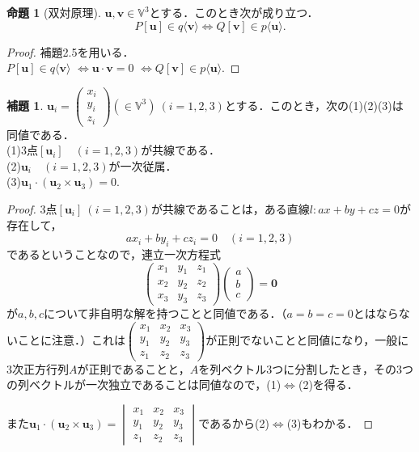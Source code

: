 \documentclass{jsarticle}
\theoremstyle{definition}
\newtheorem{prop}[theorem]{命題}
\newtheorem{lemma}[theorem]{補題}
\numberwithin{theorem}{section}
\numberwithin{equation}{section}
\begin{document}
\begin{prop}[双対原理]
$\bm{u},\bm{v}\in \mathbb{V}^3$とする．このとき次が成り立つ．
$$ P[\bm{u}]\in q\langle \bm{v}\rangle \Leftrightarrow Q[\bm{v}]\in p\langle \bm{u}\rangle .$$
\end{prop}
\begin{proof}補題2.5を用いる．
\\$P[\bm{u}]\in q\langle \bm{v}\rangle $
$\Leftrightarrow \bm{u}\cdot \bm{v}=0$
$\Leftrightarrow Q[\bm{v}]\in p\langle \bm{u}\rangle .$
\end{proof}
\begin{lemma}
$\bm{u}_i =\begin{pmatrix} x_i \\ y_i \\ z_i \end{pmatrix}(\in \mathbb{V}^3)\ (i=1,2,3)$とする．このとき，次の(1)(2)(3)は同値である．
\\(1)3点$[\bm{u}_i]\quad (i=1,2,3)$が共線である．
\\(2)$\bm{u}_i\quad (i=1,2,3)$が一次従属．
\\(3)$\bm{u}_1\cdot(\bm{u}_2\times\bm{u}_3)=0$.
\end{lemma}
\begin{proof}
3点$[\bm{u}_i]\ (i=1,2,3)$が共線であることは，ある直線$l:ax+by+cz=0$が存在して，
$$ax_i +by_i +cz_i =0 \quad (i=1,2,3)$$であるということなので，連立一次方程式
$$\begin{pmatrix}
    x_1 & y_1 & z_1 \\ x_2 & y_2 & z_2 \\ x_3 & y_3 & z_3
\end{pmatrix}
\begin{pmatrix}
    a\\b\\c
\end{pmatrix}=\bm{0} $$が$a,b,c$について非自明な解を持つことと同値である．（$a=b=c=0$とはならないことに注意．）これは$\begin{pmatrix}
    x_1 & x_2 & x_3 \\ y_1 & y_2 & y_3 \\ z_1 & z_2 & z_3
\end{pmatrix}$が正則でないことと同値になり，一般に3次正方行列$A$が正則であることと，$A$を列ベクトル3つに分割したとき，その3つの列ベクトルが一次独立であることは同値なので，(1)$\Leftrightarrow$(2)を得る．
\par また$\bm{u}_1\cdot(\bm{u}_2\times\bm{u}_3)=\begin{vmatrix}
    x_1 & x_2 & x_3 \\ y_1 & y_2 & y_3 \\ z_1 & z_2 & z_3
\end{vmatrix}$であるから(2)$\Leftrightarrow$(3)もわかる．
\end{proof}
\end{document}
